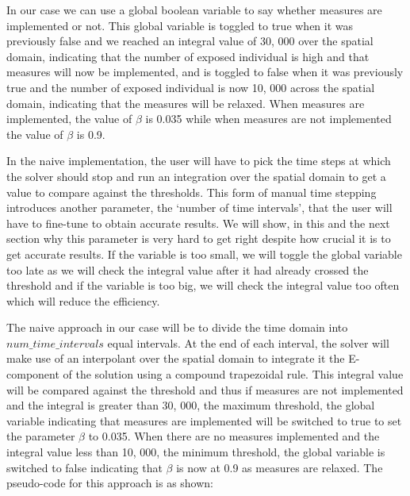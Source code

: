 \documentclass{article}
\begin{document}
In our case we can use a global boolean variable to say whether measures are implemented or not. This global variable is toggled to true when it was previously false and we reached an integral value of 30, 000 over the spatial domain, indicating that the number of exposed individual is high and that measures will now be implemented, and is toggled to false when it was previously true and the number of exposed individual is now 10, 000 across the spatial domain, indicating that the measures will be relaxed. When measures are implemented, the value of $\beta$ is 0.035 while when measures are not implemented the value of $\beta$ is 0.9.

In the naive implementation, the user will have to pick the time steps at which the solver should stop and run an integration over the spatial domain to get a value to compare against the thresholds. This form of manual time stepping introduces another parameter, the `number of time intervals', that the user will have to fine-tune to obtain accurate results. We will show, in this and the next section why this parameter is very hard to get right despite how crucial it is to get accurate results. If the variable is too small, we will toggle the global variable too late as we will check the integral value after it had already crossed the threshold and if the variable is too big, we will check the integral value too often which will reduce the efficiency. 

The naive approach in our case will be to divide the time domain into $num\_time\_intervals$ equal intervals. At the end of each interval, the solver will make use of an interpolant over the spatial domain to integrate it the E-component of the solution using a compound trapezoidal rule. This integral value will be compared against the threshold and thus if measures are not implemented and the integral is greater than 30, 000, the maximum threshold, the global variable indicating that measures are implemented will be switched to true to set the parameter $\beta$ to 0.035. When there are no measures implemented and the integral value less than 10, 000, the minimum threshold, the global variable is switched to false indicating that $\beta$ is now at 0.9 as measures are relaxed. The pseudo-code for this approach is as shown:
\end{document}

